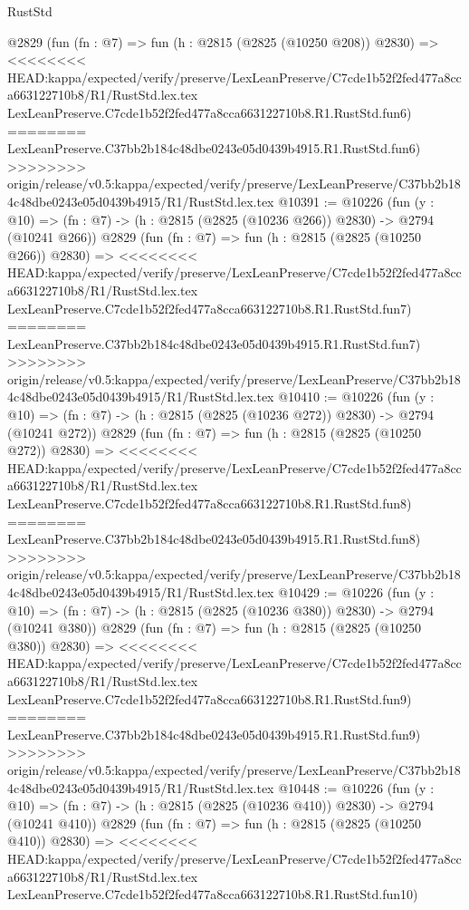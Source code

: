 \begin{lexlean}{RustStd}
\begin{coremodule}
{\begin{coremodule}
{{{{{{{{{{{{{{{    @2829
    (fun (fn : @7) =>
    fun (h : @2815 (@2825 (@10250 @208)) @2830) =>
<<<<<<<< HEAD:kappa/expected/verify/preserve/LexLeanPreserve/C7cde1b52f2fed477a8cca663122710b8/R1/RustStd.lex.tex
    LexLeanPreserve.C7cde1b52f2fed477a8cca663122710b8.R1.RustStd.fun6)
========
    LexLeanPreserve.C37bb2b184c48dbe0243e05d0439b4915.R1.RustStd.fun6)
>>>>>>>> origin/release/v0.5:kappa/expected/verify/preserve/LexLeanPreserve/C37bb2b184c48dbe0243e05d0439b4915/R1/RustStd.lex.tex
@10391 := @10226
    (fun (y : @10) => (fn : @7) -> (h : @2815 (@2825 (@10236 @266)) @2830) -> @2794 (@10241 @266))
    @2829
    (fun (fn : @7) =>
    fun (h : @2815 (@2825 (@10250 @266)) @2830) =>
<<<<<<<< HEAD:kappa/expected/verify/preserve/LexLeanPreserve/C7cde1b52f2fed477a8cca663122710b8/R1/RustStd.lex.tex
    LexLeanPreserve.C7cde1b52f2fed477a8cca663122710b8.R1.RustStd.fun7)
========
    LexLeanPreserve.C37bb2b184c48dbe0243e05d0439b4915.R1.RustStd.fun7)
>>>>>>>> origin/release/v0.5:kappa/expected/verify/preserve/LexLeanPreserve/C37bb2b184c48dbe0243e05d0439b4915/R1/RustStd.lex.tex
@10410 := @10226
    (fun (y : @10) => (fn : @7) -> (h : @2815 (@2825 (@10236 @272)) @2830) -> @2794 (@10241 @272))
    @2829
    (fun (fn : @7) =>
    fun (h : @2815 (@2825 (@10250 @272)) @2830) =>
<<<<<<<< HEAD:kappa/expected/verify/preserve/LexLeanPreserve/C7cde1b52f2fed477a8cca663122710b8/R1/RustStd.lex.tex
    LexLeanPreserve.C7cde1b52f2fed477a8cca663122710b8.R1.RustStd.fun8)
========
    LexLeanPreserve.C37bb2b184c48dbe0243e05d0439b4915.R1.RustStd.fun8)
>>>>>>>> origin/release/v0.5:kappa/expected/verify/preserve/LexLeanPreserve/C37bb2b184c48dbe0243e05d0439b4915/R1/RustStd.lex.tex
@10429 := @10226
    (fun (y : @10) => (fn : @7) -> (h : @2815 (@2825 (@10236 @380)) @2830) -> @2794 (@10241 @380))
    @2829
    (fun (fn : @7) =>
    fun (h : @2815 (@2825 (@10250 @380)) @2830) =>
<<<<<<<< HEAD:kappa/expected/verify/preserve/LexLeanPreserve/C7cde1b52f2fed477a8cca663122710b8/R1/RustStd.lex.tex
    LexLeanPreserve.C7cde1b52f2fed477a8cca663122710b8.R1.RustStd.fun9)
========
    LexLeanPreserve.C37bb2b184c48dbe0243e05d0439b4915.R1.RustStd.fun9)
>>>>>>>> origin/release/v0.5:kappa/expected/verify/preserve/LexLeanPreserve/C37bb2b184c48dbe0243e05d0439b4915/R1/RustStd.lex.tex
@10448 := @10226
    (fun (y : @10) => (fn : @7) -> (h : @2815 (@2825 (@10236 @410)) @2830) -> @2794 (@10241 @410))
    @2829
    (fun (fn : @7) =>
    fun (h : @2815 (@2825 (@10250 @410)) @2830) =>
<<<<<<<< HEAD:kappa/expected/verify/preserve/LexLeanPreserve/C7cde1b52f2fed477a8cca663122710b8/R1/RustStd.lex.tex
    LexLeanPreserve.C7cde1b52f2fed477a8cca663122710b8.R1.RustStd.fun10)
}}}}}}}}}}}}}}}
\end{coremodule}}
\end{coremodule}
\end{lexlean}
